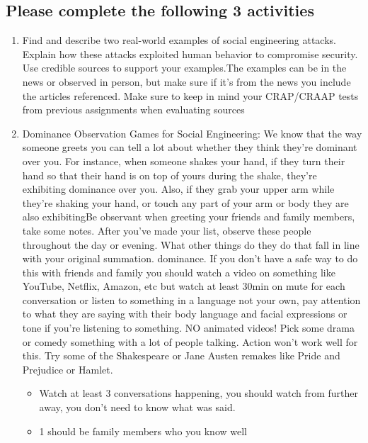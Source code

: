 \documentclass[12pt]{article}
\begin{document}

\subsection*{Please complete the following 3 activities}
    \begin{enumerate}
        \item Find and describe two real-world examples of social engineering attacks. Explain how these attacks exploited human behavior to compromise security. Use credible sources to support your examples.The examples can be in the news or observed in person, but make sure if it's from the news you include the articles referenced. Make sure to keep in mind your CRAP/CRAAP tests from previous assignments when evaluating sources
        \item Dominance Observation Games for Social Engineering: We know that the way someone greets you can tell a lot about whether they think they're dominant over you. For instance, when someone shakes your hand, if they turn their hand so that their hand is on top of yours during the shake, they're exhibiting dominance over you. Also, if they grab your upper arm while they're shaking your hand, or touch any part of your arm or body they are also exhibitingBe observant when greeting your friends and family members, take some notes. After you've made your list, observe these people throughout the day or evening. What other things do they do that fall in line with your original summation. dominance. If you don't have a safe way to do this with friends and family you should watch a video on something like YouTube, Netflix, Amazon, etc but watch at least 30min on mute for each conversation or listen to something in a language not your own, pay attention to what they are saying with their body language and facial expressions or tone if you're listening to something.   NO animated videos!  Pick some drama or comedy something with a lot of people talking.  Action won't work well for this. Try some of the Shakespeare or Jane Austen remakes like Pride and Prejudice or Hamlet. 
        \begin{itemize}
            \item Watch at least 3 conversations happening, you should watch from further away, you don't need to know what was said.
            \item 1 should be family members who you know well

\end{itemize}
\end{enumerate}
\end{document}
